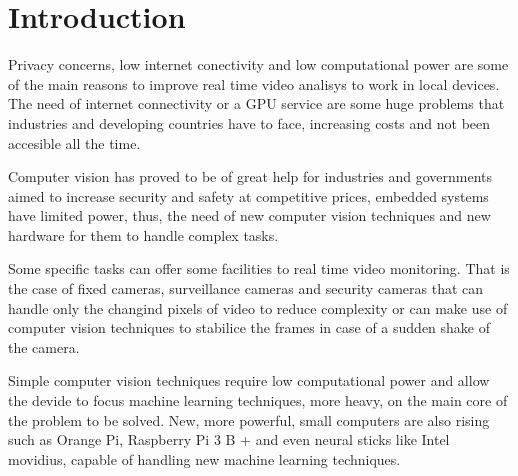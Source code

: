 \documentclass[fleqn,12pt]{SelfArx} %
\affiliation{\textsuperscript{1}\textit{Chief Technology Officer, DeMS, Smart Cities}} %
\affiliation{\textsuperscript{2}\textit{Chief Executive Officer, DeMS, Smart Cities}} %
\affiliation{*\textbf{Stanley Salvatierra}: s.salvatierra@deepmicrosystems.com} %
\begin{document}
\flushbottom %

\maketitle %

\tableofcontents %

\thispagestyle{empty} %


\section*{Introduction} %


Privacy concerns, low internet conectivity and low computational power are some of the main reasons to improve real time video analisys to work in local devices. The need of internet connectivity or a GPU service are some huge problems that industries and developing countries have to face, increasing costs and not been accesible all the time.

Computer vision has proved to be of great help for industries and governments aimed to increase security and safety at competitive prices, embedded systems have limited power, thus, the need of new computer vision techniques and new hardware for them to handle complex tasks.

Some specific tasks can offer some facilities to real time video monitoring. That is the case of fixed cameras, surveillance cameras and security cameras that can handle only the changind pixels of video to reduce complexity or can make use of computer vision techniques to stabilice the frames in case of a sudden shake of the camera.

Simple computer vision techniques require low computational power and allow the devide to focus machine learning techniques, more heavy, on the main core of the problem to be solved. New, more powerful, small computers are also rising such as Orange Pi, Raspberry Pi 3 B + and even neural sticks like Intel movidius, capable of handling new machine learning techniques.
\end{document}

